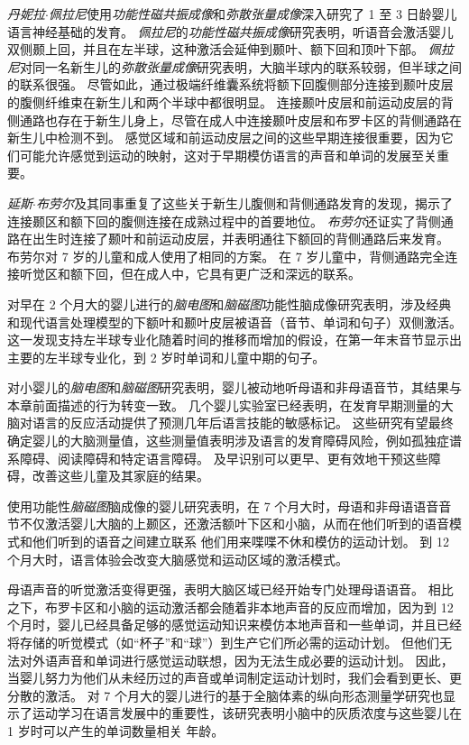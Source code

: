 \textit{丹妮拉$\cdot$佩拉尼}使用\textit{功能性磁共振成像}和\textit{弥散张量成像}深入研究了 1 至 3 日龄婴儿语言神经基础的发育。
\textit{佩拉尼}的\textit{功能性磁共振成像}研究表明，听语音会激活婴儿双侧颞上回，并且在左半球，这种激活会延伸到颞叶、额下回和顶叶下部。
\textit{佩拉尼}对同一名新生儿的\textit{弥散张量成像}研究表明，大脑半球内的联系较弱，但半球之间的联系很强。
尽管如此，通过极端纤维囊系统将额下回腹侧部分连接到颞叶皮层的腹侧纤维束在新生儿和两个半球中都很明显。
连接颞叶皮层和前运动皮层的背侧通路也存在于新生儿身上，尽管在成人中连接颞叶皮层和布罗卡区的背侧通路在新生儿中检测不到。
感觉区域和前运动皮层之间的这些早期连接很重要，因为它们可能允许感觉到运动的映射，这对于早期模仿语言的声音和单词的发展至关重要。


\textit{延斯$\cdot$布劳尔}及其同事重复了这些关于新生儿腹侧和背侧通路发育的发现，揭示了连接颞区和额下回的腹侧连接在成熟过程中的首要地位。
\textit{布劳尔}还证实了背侧通路在出生时连接了颞叶和前运动皮层，并表明通往下额回的背侧通路后来发育。
布劳尔对 7 岁的儿童和成人使用了相同的方案。
在 7 岁儿童中，背侧通路完全连接听觉区和额下回，但在成人中，它具有更广泛和深远的联系。


对早在 2 个月大的婴儿进行的\textit{脑电图}和\textit{脑磁图}功能性脑成像研究表明，涉及经典和现代语言处理模型的下额叶和颞叶皮层被语音（音节、单词和句子）双侧激活。
这一发现支持左半球专业化随着时间的推移而增加的假设，在第一年末音节显示出主要的左半球专业化，到 2 岁时单词和儿童中期的句子。


对小婴儿的\textit{脑电图}和\textit{脑磁图}研究表明，婴儿被动地听母语和非母语音节，其结果与本章前面描述的行为转变一致。
几个婴儿实验室已经表明，在发育早期测量的大脑对语言的反应活动提供了预测几年后语言技能的敏感标记。
这些研究有望最终确定婴儿的大脑测量值，这些测量值表明涉及语言的发育障碍风险，例如孤独症谱系障碍、阅读障碍和特定语言障碍。
及早识别可以更早、更有效地干预这些障碍，改善这些儿童及其家庭的结果。


使用功能性\textit{脑磁图}脑成像的婴儿研究表明，在 7 个月大时，母语和非母语语音音节不仅激活婴儿大脑的上颞区，还激活额叶下区和小脑，从而在他们听到的语音模式和他们听到的语音之间建立联系 他们用来喋喋不休和模仿的运动计划。
到 12 个月大时，语言体验会改变大脑感觉和运动区域的激活模式。


母语声音的听觉激活变得更强，表明大脑区域已经开始专门处理母语语音。
相比之下，布罗卡区和小脑的运动激活都会随着非本地声音的反应而增加，因为到 12 个月时，婴儿已经具备足够的感觉运动知识来模仿本地声音和一些单词，并且已经将存储的听觉模式（如“杯子”和“球”）到生产它们所必需的运动计划。
但他们无法对外语声音和单词进行感觉运动联想，因为无法生成必要的运动计划。
因此，当婴儿努力为他们从未经历过的声音或单词制定运动计划时，我们会看到更长、更分散的激活。
对 7 个月大的婴儿进行的基于全脑体素的纵向形态测量学研究也显示了运动学习在语言发展中的重要性，该研究表明小脑中的灰质浓度与这些婴儿在 1 岁时可以产生的单词数量相关 年龄。



